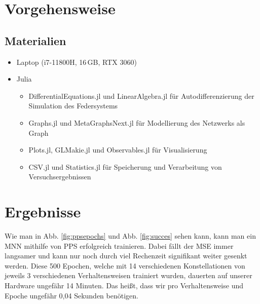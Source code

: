 \documentclass[10pt]{scrartcl}
\begin{document}

\newpage

\section{Vorgehensweise}

\subsection{Materialien}
\begin{itemize}
    \item Laptop (i7-11800H, 16\,GB, RTX 3060)
    \item Julia
    \begin{itemize}
        \item DifferentialEquations.jl und LinearAlgebra.jl für Autodifferenzierung der Simulation des Federsystems
        \item Graphs.jl und MetaGraphsNext.jl für Modellierung des Netzwerks als Graph
        \item Plots.jl, GLMakie.jl und Observables.jl für Visualisierung
        \item CSV.jl und Statistics.jl für Speicherung und Verarbeitung von Versuchsergebnissen
    \end{itemize}
\end{itemize}




\newpage

\section{Ergebnisse}

Wie man in Abb. \ref{fig:ppsepochs} und Abb. \ref{fig:succes} sehen kann, kann man ein MNN mithilfe von PPS erfolgreich trainieren. Dabei fällt der MSE immer langsamer und kann nur noch durch viel Rechenzeit signifikant weiter gesenkt werden. Diese 500 Epochen, welche mit 14 verschiedenen Konstellationen von jeweils 3 verschiedenen Verhaltensweisen trainiert wurden, dauerten auf unserer Hardware ungefähr 14 Minuten. Das heißt, dass wir pro Verhaltensweise und Epoche ungefähr 0,04 Sekunden benötigen.
\end{document}
